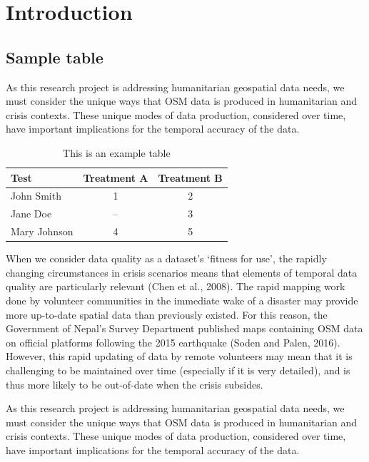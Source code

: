 \chapter{Introduction}
\label{chapterlabel1}

\section{Sample table}

As this research project is addressing humanitarian geospatial data needs, we must consider the unique ways that OSM data is produced in humanitarian and crisis contexts. These unique modes of data production, considered over time, have important implications for the temporal accuracy of the data. 

\begin{table}[ht]
\centering
\caption{This is an example table}
\begin{tabular}[t]{lcc}
\toprule
Test&Treatment A&Treatment B\\
\midrule
John Smith&1&2\\
Jane Doe&--&3\\
Mary Johnson&4&5\\
\bottomrule
\end{tabular}
\end{table}%

When we consider data quality as a dataset’s ‘fitness for use’, the rapidly changing circumstances in crisis scenarios means that elements of temporal data quality are particularly relevant (Chen et al., 2008). The rapid mapping work done by volunteer communities in the immediate wake of a disaster may provide more up-to-date spatial data than previously existed. For this reason, the Government of Nepal’s Survey Department published maps containing OSM data on official platforms following the 2015 earthquake (Soden and Palen, 2016). However, this rapid updating of data by remote volunteers may mean that it is challenging to be maintained over time (especially if it is very detailed), and is thus more likely to be out-of-date when the crisis subsides. 

As this research project is addressing humanitarian geospatial data needs, we must consider the unique ways that OSM data is produced in humanitarian and crisis contexts. These unique modes of data production, considered over time, have important implications for the temporal accuracy of the data. 

